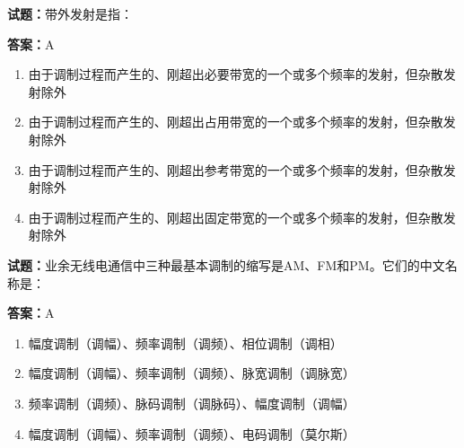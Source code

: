 \documentclass{ctexbook}
\begin{document}




\vspace{1em}

\textbf{试题：}带外发射是指： 

\textbf{答案：}A 

\begin{enumerate}[leftmargin=3em]
  \item 由于调制过程而产生的、刚超出必要带宽的一个或多个频率的发射，但杂散发射除外 

  \item 由于调制过程而产生的、刚超出占用带宽的一个或多个频率的发射，但杂散发射除外 

  \item 由于调制过程而产生的、刚超出参考带宽的一个或多个频率的发射，但杂散发射除外 

  \item 由于调制过程而产生的、刚超出固定带宽的一个或多个频率的发射，但杂散发射除外 

\end{enumerate}





\vspace{1em}

\textbf{试题：}业余无线电通信中三种最基本调制的缩写是AM、FM和PM。它们的中文名称是： 

\textbf{答案：}A 

\begin{enumerate}[leftmargin=3em]
  \item 幅度调制（调幅）、频率调制（调频）、相位调制（调相） 

  \item 幅度调制（调幅）、频率调制（调频）、脉宽调制（调脉宽） 

  \item 频率调制（调频）、脉码调制（调脉码）、幅度调制（调幅） 

  \item 幅度调制（调幅）、频率调制（调频）、电码调制（莫尔斯） 

\end{enumerate}





\vspace{1em}
\end{document}

